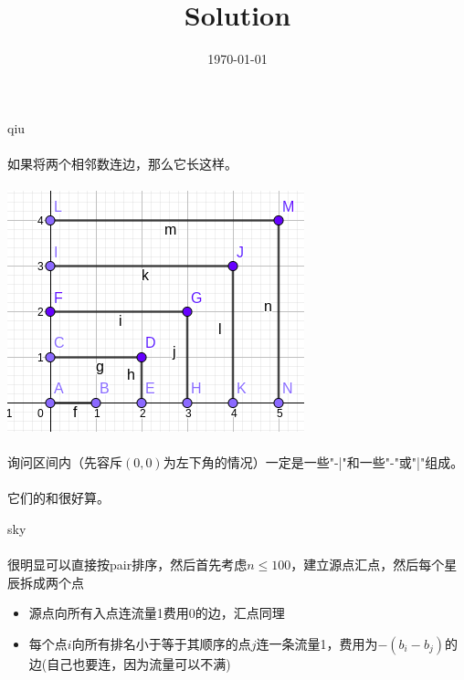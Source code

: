 \documentclass[UTF8]{ctexart}
\begin{document}
\title{Solution}
\author{}
\date{\today}
\maketitle
\clearpage

\begin{center}
	\large{qiu}
\end{center}
\paragraph{} 如果将两个相邻数连边，那么它长这样。
\paragraph{} \includegraphics[]{1.png}
\paragraph{} 询问区间内（先容斥$(0,0)$为左下角的情况）一定是一些"-|"和一些"-"或"|"组成。
\paragraph{} 它们的和很好算。

\clearpage

\begin{center}
	\large{sky}
\end{center}
\paragraph{}很明显可以直接按pair排序，然后首先考虑$n\leq 100$，建立源点汇点，然后每个星辰拆成两个点
\begin{itemize}
\item 源点向所有入点连流量1费用0的边，汇点同理
\item 每个点$i$向所有排名小于等于其顺序的点$j$连一条流量1，费用为$-(b_i-b_j)$的边(自己也要连，因为流量可以不满)
\end{itemize}
\end{document}
